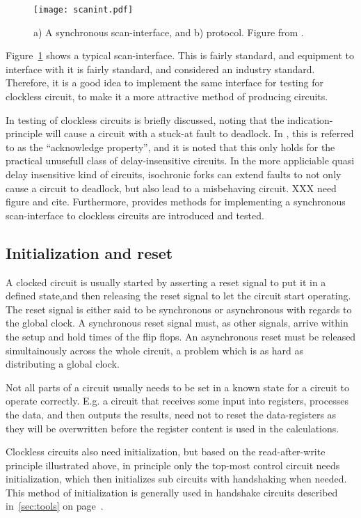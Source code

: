 \begin{figure}[htbp]
  \centering
  \texttt{[image: scanint.pdf]}
  \caption{a) A synchronous scan-interface, and b) protocol. Figure
    from \cite[pp. 11]{fullscan}.}
  \label{fig:scanint}
\end{figure}

Figure~\ref{fig:scanint} shows a typical scan-interface. This is
fairly standard, and equipment to interface with it is fairly
standard, and considered an industry standard. Therefore, it is
a good idea to implement the same interface for testing for clockless
circuit, to make it a more attractive method of producing circuits.

In \cite[pp. 27-28]{sparso} testing of clockless circuits is briefly
discussed, noting that the indication-principle will cause a circuit
with a stuck-at fault to deadlock. In \cite[pp. 26]{fullscan}, this is
referred to as the ``acknowledge property'', and it is noted that this
only holds for the practical unusefull class of delay-insensitive
circuits. In the more appliciable quasi delay insensitive kind of
circuits, isochronic forks can extend faults to not only cause a
circuit to deadlock, but also lead to a misbehaving circuit. XXX need
figure and cite.  Furthermore, \cite{fullscan} provides methods for
implementing a synchronous scan-interface to clockless circuits are
introduced and tested.

\subsection{Initialization and reset}

A clocked circuit is usually started by asserting a reset signal to
put it in a defined state,and then releasing the reset signal to let
the circuit start operating. The reset signal is either said to be
synchronous or asynchronous with regards to the global clock. A
synchronous reset signal must, as other signals, arrive within the
setup and hold times of the flip flops. An asynchronous reset must be
released simultainously across the whole circuit, a problem which is
as hard as distributing a global clock.

Not all parts of a circuit usually needs to be set in a known state
for a circuit to operate correctly. E.g. a circuit that receives some
input into registers, processes the data, and then outputs the
results, need not to reset the data-registers as they will be
overwritten before the register content is used in the calculations.

Clockless circuits also need initialization, but based on the
read-after-write principle illustrated above, in principle only the
top-most control circuit needs initialization, which then initializes
sub circuits with handshaking when needed. This method of
initialization is generally used in handshake circuits described
in~\ref{sec:tools} on page~\pageref{par:init}.

